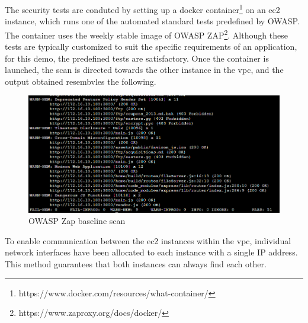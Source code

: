 The security tests are conduted by setting up a docker container\footnote{https://www.docker.com/resources/what-container/} on an \acrshort{ec2} instance, which runs one of the automated standard tests predefined by OWASP. The container uses the weekly stable image of OWASP ZAP\footnote{https://www.zaproxy.org/docs/docker/}. Although these tests are typically customized to suit the specific requirements of an application, for this demo, the predefined tests are satisfactory. Once the container is launched, the scan is directed towards the other instance in the \acrshort{vpc}, and the output obtained resembvles the following.

\vspace{2mm}
\begin{figure}[H]
    \centering
    \includegraphics[width=0.8\columnwidth]{Images/owasp-zap-scan.png}
    \caption{OWASP Zap baseline scan}
    \label{fig: OWASP Zap baseline scan}
\end{figure}



To enable communication between the \acrshort{ec2} instances within the \acrshort{vpc}, individual network interfaces have been allocated to each instance with a single IP address. This method guarantees that both instances can always find each other. 

